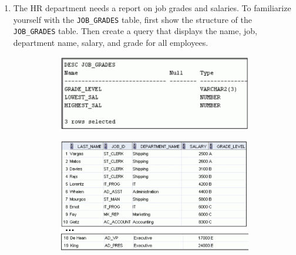 \documentclass[a4paper,12pt]{article}
\begin{document}
\begin{enumerate}
        \item The HR department needs a report on job grades and salaries. To familiarize yourself with the
\texttt{JOB\_GRADES} table, first show the structure of the \texttt{JOB\_GRADES} table. Then create a query
that displays the name, job, department name, salary, and grade for all employees.
    
    \begin{figure}[h]
    \centering
    \begin{subfigure}[b]{0.45\linewidth}
        \centering
        \includegraphics[width=\linewidth]{graphics/67.1.png}
    \end{subfigure}
    \hfill
    \begin{subfigure}[b]{0.5\linewidth}
        \centering
        \includegraphics[width=\linewidth]{graphics/67.2.png}
    \end{subfigure}

\end{figure}
\end{enumerate}
\end{document}
